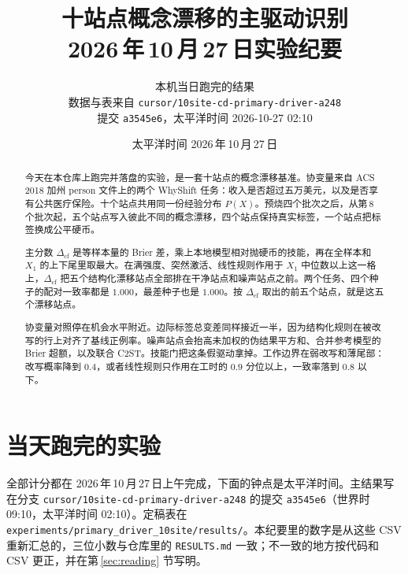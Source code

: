 \documentclass[11pt,a4paper,fontset=none]{ctexart}
\title{十站点概念漂移的主驱动识别\\[0.35em]
\normalsize 2026\,年\,10\,月\,27\,日实验纪要}
\author{本机当日跑完的结果\\
\normalsize 数据与表来自 \texttt{cursor/10site-cd-primary-driver-a248}\\
\normalsize 提交 \texttt{a3545e6}，太平洋时间 2026-10-27 02:10}
\date{太平洋时间 2026\,年\,10\,月\,27\,日}
\newcommand{\Dcf}{\ensuremath{\Delta_{\mathrm{cf}}}}
\begin{document}
\maketitle

\begin{abstract}
\noindent
今天在本仓库上跑完并落盘的实验，是一套十站点的概念漂移基准。协变量来自 ACS\,2018 加州 person 文件上的两个 WhyShift 任务：收入是否超过五万美元，以及是否享有公共医疗保险。十个站点共用同一份经验分布 \(P(X)\)。预烧四个批次之后，从第\,8\,个批次起，五个站点写入彼此不同的概念漂移，四个站点保持真实标签，一个站点把标签换成公平硬币。

主分数 \(\Dcf\) 是等样本量的 Brier 差，乘上本地模型相对抛硬币的技能，再在全样本和 \(X_1\) 的上下尾里取最大。在满强度、突然激活、线性规则作用于 \(X_1\) 中位数以上这一格上，\(\Dcf\) 把五个结构化漂移站点全部排在干净站点和噪声站点之前。两个任务、四个种子的配对一致率都是 \(1.000\)，最差种子也是 \(1.000\)。按 \(\Dcf\) 取出的前五个站点，就是这五个漂移站点。

协变量对照停在机会水平附近。边际标签总变差同样接近一半，因为结构化规则在被改写的行上对齐了基线正例率。噪声站点会抬高未加权的伪结果平方和、合并参考模型的 Brier 超额，以及联合 C2ST。技能门把这条假驱动拿掉。工作边界在弱改写和薄尾部：改写概率降到 \(0.4\)，或者线性规则只作用在工时的 \(0.9\) 分位以上，一致率落到 \(0.8\) 以下。
\end{abstract}

\tableofcontents

\section{当天跑完的实验}

全部计分都在 2026\,年\,10\,月\,27\,日上午完成，下面的钟点是太平洋时间。主结果写在分支 \texttt{cursor/\allowbreak 10site-cd-\allowbreak primary-driver-a248} 的提交 \texttt{a3545e6}（世界时 09:10，太平洋时间 02:10）。定稿表在 \texttt{experiments/\allowbreak primary\_driver\_\allowbreak 10site/results/}。本纪要里的数字是从这些 CSV 重新汇总的，三位小数与仓库里的 \texttt{RESULTS.md} 一致；不一致的地方按代码和 CSV 更正，并在第\,\ref{sec:reading} 节写明。
\end{document}
